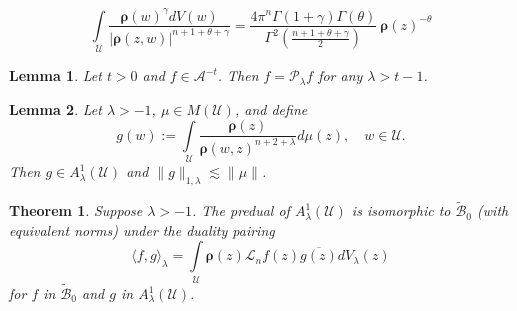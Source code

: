\documentclass[10pt,a4paper]{amsart}
\newtheorem{theorem}{Theorem}
\newtheorem{lemma}{Lemma}
\newcommand{\bfrho}{\boldsymbol{\rho}}
\newcommand{\calB}{\mathcal{B}}
\newcommand{\calL}{\mathcal{L}}
\newcommand{\calU}{\mathcal{U}}
\begin{document}
\begin{equation}\label{eqn:keylem}
\int\limits_{\calU} \frac {\bfrho(w)^{\gamma} dV(w)} {|\bfrho(z,w)|^{n+1+\theta+\gamma}}  =
\frac {4 \pi^{n} \Gamma(1+\gamma) \Gamma(\theta)} {\Gamma^2\left(\frac {n+1+\theta+\gamma}{2}\right)}\ \bfrho(z)^{-\theta}
\end{equation}

\begin{lemma}\label{lem:Bek83}
Let $t>0$ and $f\in\mathcal{A}^{-t}$. Then $f=\mathcal{P}_{\lambda}f$ for any $\lambda> t-1$.
\end{lemma}

\begin{lemma}\label{lem:mu}
Let $\lambda>-1$, $\mu\in M(\calU)$, and define
\[
g(w):=\int\limits_{\calU} \frac{\bfrho(z)}{\bfrho(w,z)^{n+2+\lambda}} d\mu(z), \quad w\in \calU.
\]
Then $g\in A_\lambda^1(\calU)$ and $\|g\|_{1,\lambda}\lesssim \|\mu\|$.
\end{lemma}

\begin{theorem}\label{thm:predual}
Suppose $\lambda>-1$. The predual of $A_\lambda^1(\calU)$ is isomorphic to $\widetilde{\calB}_0$ (with equivalent norms) under the duality pairing
\[
\langle f,g \rangle_\lambda = \int\limits_{\calU} \bfrho(z) \calL_n f(z) \overline{g(z)}  dV_\lambda(z)
\]
for $f$ in $\widetilde{\calB}_0$ and $g$ in $A_\lambda^1(\calU)$.
\end{theorem}
\end{document}
